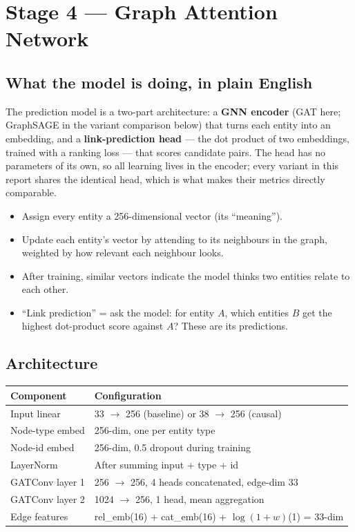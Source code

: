 \documentclass[11pt]{article}
\begin{document}
\section{Stage 4 --- Graph Attention Network}
\label{sec:gat}

\subsection{What the model is doing, in plain English}
The prediction model is a two-part architecture: a \textbf{GNN encoder} (GAT here; GraphSAGE in the variant comparison below) that turns each entity into an embedding, and a \textbf{link-prediction head} --- the dot product of two embeddings, trained with a ranking loss --- that scores candidate pairs. The head has no parameters of its own, so all learning lives in the encoder; every variant in this report shares the identical head, which is what makes their metrics directly comparable.
\begin{itemize}
  \item Assign every entity a 256-dimensional vector (its ``meaning'').
  \item Update each entity's vector by attending to its neighbours in the graph, weighted by how relevant each neighbour looks.
  \item After training, similar vectors indicate the model thinks two entities relate to each other.
  \item ``Link prediction'' = ask the model: for entity \(A\), which entities \(B\) get the highest dot-product score against \(A\)? These are its predictions.
\end{itemize}

\subsection{Architecture}
\begin{center}
\begin{tabular}{ll}
\toprule
\textbf{Component} & \textbf{Configuration} \\
\midrule
Input linear       & 33 \(\to\) 256 (baseline) or 38 \(\to\) 256 (causal) \\
Node-type embed    & 256-dim, one per entity type \\
Node-id embed      & 256-dim, 0.5 dropout during training \\
LayerNorm          & After summing input + type + id \\
GATConv layer 1    & 256 \(\to\) 256, 4 heads concatenated, edge-dim 33 \\
GATConv layer 2    & 1024 \(\to\) 256, 1 head, mean aggregation \\
Edge features      & rel\_emb(16) + cat\_emb(16) + \(\log(1+w)\)(1) = 33-dim \\
\bottomrule
\end{tabular}
\end{center}
\end{document}
